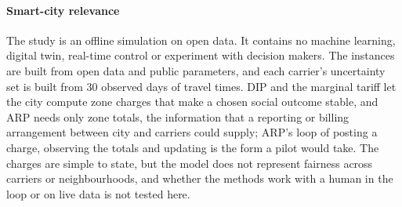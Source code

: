 \documentclass[preprint,11pt]{elsarticle}
\theoremstyle{definition}
\theoremstyle{remark}
\begin{document}
\paragraph{Smart-city relevance} The study is an offline simulation on open data. It contains no machine learning, digital twin, real-time control or experiment with decision makers. The instances are built from open data and public parameters, and each carrier's uncertainty set is built from 30 observed days of travel times. DIP and the marginal tariff let the city compute zone charges that make a chosen social outcome stable, and ARP needs only zone totals, the information that a reporting or billing arrangement between city and carriers could supply; ARP's loop of posting a charge, observing the totals and updating is the form a pilot would take. The charges are simple to state, but the model does not represent fairness across carriers or neighbourhoods, and whether the methods work with a human in the loop or on live data is not tested here.
\end{document}
